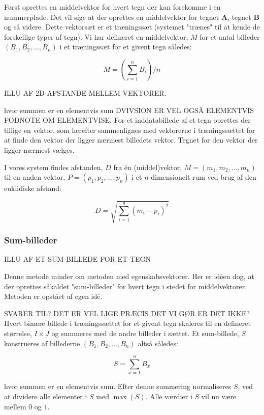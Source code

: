 Først oprettes en middelvektor for hvert tegn der kan forekomme i en nummerplade. Det vil sige at der oprettes en middelvektor for tegnet \textbf{A}, tegnet \textbf{B} og så videre. Dette vektorsæt er et træningssæt (systemet "trænes" til at kende de forskellige typer af tegn). Vi har defineret en middelvektor, $M$ for et antal billeder $(B_{1},B_{2},...,B_{n})$ i et træningssæt for et givent tegn således:

\begin{displaymath}
	M = (\sum_{i=1}^{n}B_i)/n
\end{displaymath}

ILLU AF 2D-AFSTANDE MELLEM VEKTORER.

hvor summen er en elementvis sum DVIVSION ER VEL OGSÅ ELEMENTVIS FODNOTE OM ELEMENTVISE. For et inddatabillede af et tegn oprettes der tillige en vektor, som herefter sammenlignes med vektorerne i træningssættet for at finde den vektor der ligger nærmest billedets vektor. Tegnet for den vektor der ligger nærmest vælges.

I vores system findes afstanden, $D$ fra én (middel)vektor, $M = (m_{1},m_{2},...,m_{n})$ til en anden vektor, $P = (p_{1},p_{2},...,p_{n})$ i et $n$-dimensionelt rum ved brug af den euklidiske afstand\cite{wiki_euclid}:

\begin{displaymath}
	D = \sqrt{\sum_{i=1}^{n}(m_{i}-p_{i})^{2}}
\end{displaymath}

\subsubsection{Sum-billeder}

ILLU AF ET SUM-BILLEDE FOR ET TEGN

Denne metode minder om metoden med egenskabsvektorer. Her er idéen dog, at der oprettes såkaldet "sum-billeder" for hvert tegn i stedet for middelvektorer. Metoden er opstået af egen idé.

SVARER TIL? DET ER VEL LIGE PRÆCIS DET VI GØR ER DET IKKE?
Hvert binære billede i træningssættet for et givent tegn skaleres til en defineret størrelse, $I \times J$ og summeres med de andre billeder i sættet. Et sum-billede, $S$ konstrueres af billederne $(B_{1},B_{2},...,B_{n})$ altså således:

\begin{displaymath}
	S = \sum_{x=1}^n{B_x}
\end{displaymath}

hvor summen er en elementvis sum. Efter denne summering normaliseres $S$, ved at dividere alle elementer i $S$ med $\max{(S)}$. Alle værdier i $S$ vil nu være mellem $0$ og $1$.

